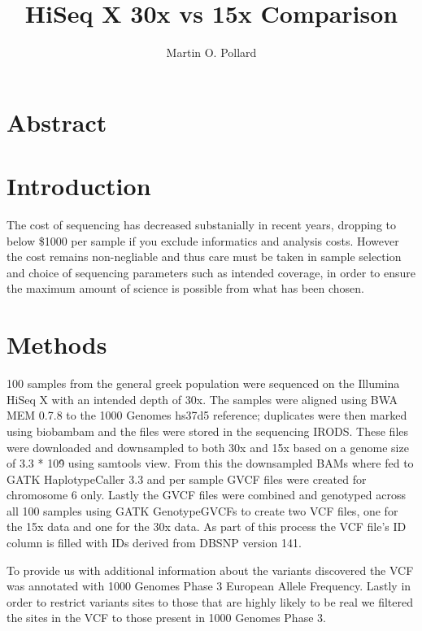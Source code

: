 \documentclass{article}
\title{HiSeq X 30x vs 15x Comparison}
\author{Martin O. Pollard}
\begin{document}
  \maketitle
  \newpage
  \tableofcontents
  \newpage
  \section{Abstract}

  \section{Introduction}

  The cost of sequencing has decreased substanially in recent years, dropping to
  below \$1000 per sample if you exclude informatics and analysis costs. However
  the cost remains non-negliable and thus care must be taken in sample
  selection and choice of sequencing parameters such as intended coverage, in
  order to ensure the maximum amount of science is possible from what has been
  chosen.

  \section{Methods}
  100 samples from the general greek population were sequenced on the Illumina
  HiSeq X with an intended depth of 30x. The samples were aligned using BWA MEM
  0.7.8 to the 1000 Genomes hs37d5 reference; duplicates were then marked using
  biobambam and the files were stored in the sequencing IRODS.  These files were
  downloaded and downsampled to both 30x and 15x based on a genome size of 3.3 *
  10\^9 using samtools view. From this the downsampled BAMs where fed to GATK
  HaplotypeCaller 3.3 and per sample GVCF files were created for chromosome 6
  only. Lastly the GVCF files were combined and genotyped across all 100 samples
  using GATK GenotypeGVCFs to create two VCF files, one for the 15x data and one
  for the 30x data. As part of this process the VCF file's ID column is filled
  with IDs derived from DBSNP version 141.

  To provide us with additional information about the variants discovered the
  VCF was annotated with 1000 Genomes Phase 3 European Allele Frequency.  Lastly
  in order to restrict variants sites to those that are highly likely to be
  real we filtered the sites in the VCF to those present in 1000 Genomes Phase
  3.
\end{document}
